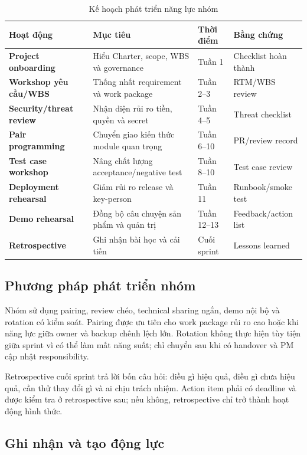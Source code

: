 \begin{table}[H]
\centering
\caption{Kế hoạch phát triển năng lực nhóm}
\label{tab:training-plan}
\begin{tabularx}{\textwidth}{| >{\bfseries}p{3.7cm} | p{4.2cm} | p{3cm} | X |}
\hline
Hoạt động & Mục tiêu & Thời điểm & Bằng chứng \\
\hline
Project onboarding & Hiểu Charter, scope, WBS và governance & Tuần 1 & Checklist hoàn thành \\ \hline
Workshop yêu cầu/WBS & Thống nhất requirement và work package & Tuần 2--3 & RTM/WBS review \\ \hline
Security/threat review & Nhận diện rủi ro tiền, quyền và secret & Tuần 4--5 & Threat checklist \\ \hline
Pair programming & Chuyển giao kiến thức module quan trọng & Tuần 6--10 & PR/review record \\ \hline
Test case workshop & Nâng chất lượng acceptance/negative test & Tuần 8--10 & Test case review \\ \hline
Deployment rehearsal & Giảm rủi ro release và key-person & Tuần 11 & Runbook/smoke test \\ \hline
Demo rehearsal & Đồng bộ câu chuyện sản phẩm và quản trị & Tuần 12--13 & Feedback/action list \\ \hline
Retrospective & Ghi nhận bài học và cải tiến & Cuối sprint & Lessons learned \\
\hline
\end{tabularx}
\end{table}

\subsection{Phương pháp phát triển nhóm}

Nhóm sử dụng pairing, review chéo, technical sharing ngắn, demo nội bộ và rotation có kiểm soát. Pairing được ưu tiên cho work package rủi ro cao hoặc khi năng lực giữa owner và backup chênh lệch lớn. Rotation không thực hiện tùy tiện giữa sprint vì có thể làm mất năng suất; chỉ chuyển sau khi có handover và PM cập nhật responsibility.

Retrospective cuối sprint trả lời bốn câu hỏi: điều gì hiệu quả, điều gì chưa hiệu quả, cần thử thay đổi gì và ai chịu trách nhiệm. Action item phải có deadline và được kiểm tra ở retrospective sau; nếu không, retrospective chỉ trở thành hoạt động hình thức.

\subsection{Ghi nhận và tạo động lực}

